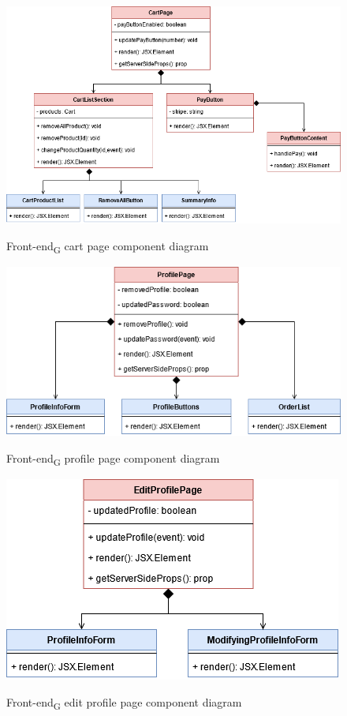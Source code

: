 \begin{figure}[H]
\centering
\includegraphics[scale=0.50]{res/Architettura/Frontend/img/cart}\\
\caption{Front-end\textsubscript{G} cart page component diagram}
\end{figure}

\begin{figure}[H]
\centering
\includegraphics[scale=0.50]{res/Architettura/Frontend/img/profile}\\
\caption{Front-end\textsubscript{G} profile page component diagram}
\end{figure}

\begin{figure}[H]
\centering
\includegraphics[scale=0.50]{res/Architettura/Frontend/img/editProfile}\\
\caption{Front-end\textsubscript{G} edit profile page component diagram}
\end{figure}

